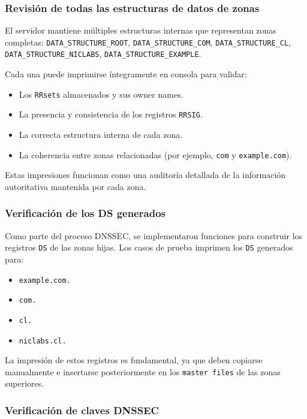 \subsubsection{Revisión de todas las estructuras de datos de zonas}

El servidor mantiene múltiples estructuras internas que representan zonas completas:  
\texttt{DATA\_STRUCTURE\_ROOT}, \texttt{DATA\_STRUCTURE\_COM}, \texttt{DATA\_STRUCTURE\_CL}, \texttt{DATA\_STRUCTURE\_NICLABS}, \texttt{DATA\_STRUCTURE\_EXAMPLE}.

Cada una puede imprimirse íntegramente en consola para validar:

\begin{itemize}
    \item Los \texttt{RRsets} almacenados y sus owner names.
    \item La presencia y consistencia de los registros \texttt{RRSIG}.
    \item La correcta estructura interna de cada zona.
    \item La coherencia entre zonas relacionadas (por ejemplo, \texttt{com} y \texttt{example.com}).
\end{itemize}

Estas impresiones funcionan como una auditoría detallada de la información autoritativa mantenida por cada zona.

\subsubsection{Verificación de los DS generados}

Como parte del proceso DNSSEC, se implementaron funciones para construir los registros \texttt{DS} de las zonas hijas. Los casos de prueba imprimen los \texttt{DS} generados para:

\begin{itemize}
    \item \texttt{example.com.}
    \item \texttt{com.}
    \item \texttt{cl.}
    \item \texttt{niclabs.cl.}
\end{itemize}

La impresión de estos registros es fundamental, ya que deben copiarse manualmente e insertarse posteriormente en los \texttt{master files} de las zonas superiores.  

\subsubsection{Verificación de claves DNSSEC}

